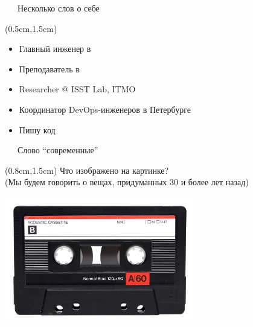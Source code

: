 \documentclass[xetex,18pt,aspectratio=43]{beamer}
\begin{document}
\begin{Large}
\begin{frame}{\ \ \ Несколько слов о себе}
\begin{textblock*}{\framewidth-0.8cm}(0.5cm,1.5cm)
\begin{itemize}
  \item Главный инженер в \href{https://gitinsky.com}{\color{blue}{Git in Sky}}
  \item Преподаватель в \href{http://avalon.ru}{\color{blue}{avalon.ru}}
  \item Researcher @ ISST Lab, ITMO
  \item Координатор \href{https://meetup.com/DevOps-40}{\color{blue}{встреч}} DevOps-инженеров в Петербурге
  \item Пишу код
\end{itemize}
\end{textblock*}
\end{frame}

\begin{frame}{\ \ \ Слово \enquote{современные}}
\begin{textblock*}{\framewidth}(0.8cm,1.5cm)
Что изображено на картинке?\\
{\small (Мы будем говорить о вещах, придуманных 30 и более лет назад)}
\begin{minipage}{\textwidth}
  \centering
  \includegraphics[height=5.5cm]{img/cassette}
\end{minipage}
\end{textblock*}
\end{frame}


\end{Large}
\end{document}
